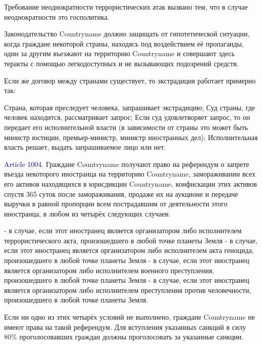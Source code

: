 \documentclass[11pt]{article}
\theoremstyle{remark}
\theoremstyle{definition}
\begin{document}
\color{blue}

Требование неоднократности террористических атак вызвано тем, что в случае неоднократности это госполитика.



Законодательство Countryname должно защищать от гипотетической ситуации, когда граждане некоторой страны, находясь под воздействием её пропаганды, один за другим въезжают на территорию Countryname и совершают здесь теракты с помощью легкодоступных и не вызывающих подозрений средств. 
 

\color{black}








Если же договор между странами существует, то экстрадиция работает примерно так:

Страна, которая преследует человека, запрашивает экстрадицию;
Суд страны, где человек находится, рассматривает запрос;
Если суд удовлетворяет запрос, то он передает его исполнительной власти (в зависимости от страны это может быть министр юстиции, премьер-министр, министр иностранных дел);
Исполнительная власть решает, выдать запрашиваемое лицо или нет. 


\textcolor{blue}{Article 1004.} Граждане Countryname получают право на референдум о запрете въезда некоторого иностранца на территорию Countryname, замораживании всех его активов находящихся в юрисдикции Countryname, конфискации этих активов спустя 365 суток после замораживания, продаже их на аукционе и передаче выручки в равной пропорции всем пострадавшим от деятельности этого иностранца, в любом из четырёх следующих случаев:

- в случае, если этот иностранец является организатором либо исполнителем террористического акта, произошедшего в любой точке планеты Земля
- в случае, если этот иностранец является организатором либо исполнителем акта геноцида, произошедшего в любой точке планеты Земля
- в случае, если этот иностранец является организатором либо исполнителем военного преступления, произошедшего в любой точке планеты Земля
- в случае, если этот иностранец является организатором либо исполнителем преступления против человечности, произошедшего в любой точке планеты Земля.


Если ни одно из этих четырёх условий не выполнено, граждане Countryname не имеют права на такой референдум. Для вступления указанных санкций в силу 80\% проголосовавших граждан должны проголосовать за указанные санкции.
\end{document}
